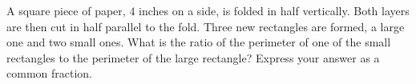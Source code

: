A square piece of paper, $4$ inches on a side, is folded in half vertically. Both layers are then cut in half parallel to the fold. Three new rectangles are formed, a large one and two small ones. What is the ratio of the perimeter of one of the small rectangles to the perimeter of the large rectangle? Express your answer as a common fraction.
